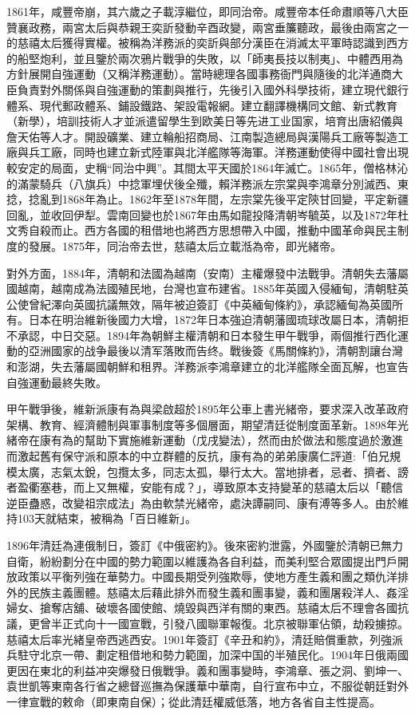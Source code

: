 1861年，咸豐帝崩，其六歲之子載淳繼位，即同治帝。咸豐帝本任命肅順等八大臣贊襄政務，兩宮太后與恭親王奕訢發動辛酉政變，兩宮垂簾聽政，最後由兩宮之一的慈禧太后獲得實權。被稱為洋務派的奕訢與部分漢臣在消滅太平軍時認識到西方的船堅炮利，並且鑒於兩次鴉片戰爭的失敗，以「師夷長技以制夷」、中體西用為方針展開自強運動（又稱洋務運動）。當時總理各國事務衙門與隨後的北洋通商大臣負責對外關係與自強運動的策劃與推行，先後引入國外科學技術，建立現代銀行體系、現代郵政體系、鋪設鐵路、架設電報網。建立翻譯機構同文館、新式教育（新學），培訓技術人才並派遣留學生到欧美日等先进工业国家，培育出唐紹儀與詹天佑等人才。開設礦業、建立輪船招商局、江南製造總局與漢陽兵工廠等製造工廠與兵工廠，同時也建立新式陸軍與北洋艦隊等海軍。洋務運動使得中國社會出現較安定的局面，史稱“同治中興”。其間太平天國於1864年滅亡。1865年，僧格林沁的滿蒙騎兵（八旗兵）中捻軍埋伏後全殲，賴洋務派左宗棠與李鴻章分別滅西、東捻，捻亂到1868年為止。1862年至1878年間，左宗棠先後平定陝甘回變，平定新疆回亂，並收回伊犁。雲南回變也於1867年由馬如龍投降清朝岑毓英，以及1872年杜文秀自殺而止。西方各國的租借地也將西方思想帶入中國，推動中國革命與民主制度的發展。1875年，同治帝去世，慈禧太后立載湉為帝，即光緒帝。

對外方面，1884年，清朝和法國為越南（安南）主權爆發中法戰爭。清朝失去藩屬國越南，越南成為法國殖民地，台灣也宣布建省。1885年英國入侵緬甸，清朝駐英公使曾紀澤向英國抗議無效，隔年被迫簽訂《中英緬甸條約》，承認緬甸為英國所有。日本在明治維新後國力大增，1872年日本強迫清朝藩國琉球改屬日本，清朝拒不承認，中日交惡。1894年為朝鮮主權清朝和日本發生甲午戰爭，兩個推行西化運動的亞洲國家的战争最後以清军落敗而告终。戰後簽《馬關條約》，清朝割讓台灣和澎湖，失去藩屬國朝鮮和租界。洋務派李鴻章建立的北洋艦隊全面瓦解，也宣告自強運動最終失敗。

甲午戰爭後，維新派康有為與梁啟超於1895年公車上書光緒帝，要求深入改革政府架構、教育、經濟體制與軍事制度等多個層面，期望清廷從制度面革新。1898年光緒帝在康有為的幫助下實施維新運動（戊戌變法），然而由於做法和態度過於激進而激起舊有保守派和原本的中立群體的反抗，康有為的弟弟康廣仁評道:「伯兄規模太廣，志氣太銳，包攬太多，同志太孤，舉行太大。當地排者，忌者、擠者、謗者盈衢塞巷，而上又無權，安能有成？」，導致原本支持變革的慈禧太后以「聽信逆臣蠱惑，改變祖宗成法」為由軟禁光緒帝，處決譚嗣同、康有溥等多人。由於維持103天就結束，被稱為「百日維新」。

1896年清廷為連俄制日，簽訂《中俄密約》。後來密約泄露，外國鑒於清朝已無力自衛，紛紛劃分在中國的勢力範圍以維護為各自利益，而美利堅合眾國提出門戶開放政策以平衡列強在華勢力。中國長期受列強欺辱，使地方產生義和團之類仇洋排外的民族主義團體。慈禧太后藉此排外而發生義和團事變，義和團屠殺洋人、姦淫婦女、搶奪店舖、破壞各國使館、燒毀與西洋有關的東西。慈禧太后不理會各國抗議，更曾半正式向十一國宣戰，引發八國聯軍報復。北京被聯軍佔領，劫殺擄掠。慈禧太后率光緒皇帝西逃西安。1901年簽訂《辛丑和約》，清廷賠償重款，列強派兵駐守北京一帶、劃定租借地和勢力範圍，加深中国的半殖民化。1904年日俄兩國更因在東北的利益冲突爆發日俄戰爭。義和團事變時，李鴻章、張之洞、劉坤一、袁世凱等東南各行省之總督巡撫為保護華中華南，自行宣布中立，不服從朝廷對外一律宣戰的敕命（即東南自保）；從此清廷權威低落，地方各省自主性提高。

